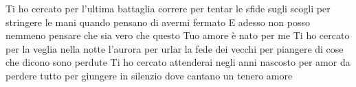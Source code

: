 \beginverse
Ti ho cercato
per l'ultima battaglia
correre
per tentar le sfide sugli scogli
per stringere le mani quando pensano
di avermi fermato
\endverse
\beginchorus
E adesso non posso nemmeno pensare
che sia vero che questo Tuo amore
è nato per me
\endchorus
\beginverse
Ti ho cercato
per la veglia nella notte
l'aurora
per urlar la fede dei vecchi
per piangere di cose che dicono
sono perdute
\endverse \beginverse
Ti ho cercato
attenderai negli anni
nascosto
per amor da perdere tutto
per giungere in silenzio dove cantano
un tenero amore
\endverse
\endsong
